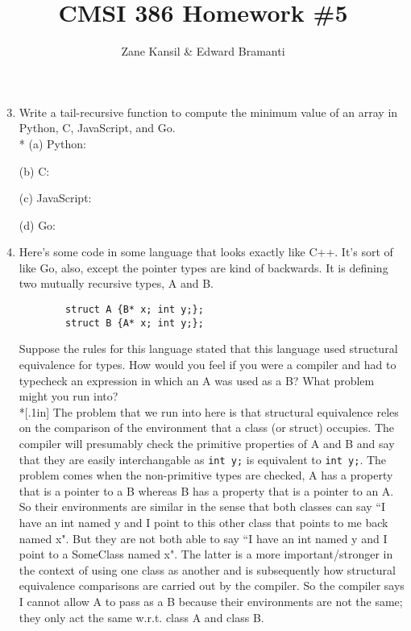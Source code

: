 \documentclass{article}
\title{CMSI 386 Homework \#5}
\author{Zane Kansil \& Edward Bramanti}
\begin{document}
\maketitle
\begin{enumerate}
    \setcounter{enumi}{2}
    \item Write a tail-recursive function to compute the minimum value of an array in Python, C, JavaScript, and Go. \\*
    \linebreak
    (a) Python:
    
    (b) C:
    
    \pagebreak
    (c) JavaScript:
    
    (d) Go:
    
    \pagebreak
    \item Here's some code in some language that looks exactly like C++. It's sort of like Go, also, except the pointer types are kind of backwards. It is defining two mutually recursive types, A and B.
    \begin{verbatim}
        struct A {B* x; int y;};
        struct B {A* x; int y;};
    \end{verbatim}
    Suppose the rules for this language stated that this language used structural equivalence for types. How would you feel if you were a compiler and had to typecheck an expression in which an A was used as a B? What problem might you run into? \\*[.1in]
    The problem that we run into here is that structural equivalence reles on the comparison of the environment that a class (or struct) occupies. The compiler will presumably check the primitive properties of A and B and say that they are easily interchangable as \texttt{int y;} is equivalent to \texttt{int y;}. The problem comes when the non-primitive types are checked, A has a property that is a pointer to a B whereas B has a property that is a pointer to an A. \\

    So their environments are similar in the sense that both classes can say ``I have an int named y and I point to this other class that points to me back named x". But they are not both able to say ``I have an int named y and I point to a SomeClass named x". The latter is a more important/stronger in the context of using one class as another and is subsequently how structural equivalence comparisons are carried out by the compiler. So the compiler says I cannot allow A to pass as a B because their environments are not the same; they only act the same w.r.t. class A and class B. \\


\end{enumerate}
\end{document}
